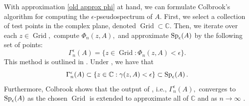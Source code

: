 



With approximation \eqref{old approx phi} at hand, we can formulate Colbrook's algorithm for computing the $\epsilon$-pseudospectrum of $A.$ First, we select a collection of test points in the complex plane, denoted $\operatorname{Grid} \subset \mathbb{C}.$ Then, we iterate over each $z \in \operatorname{Grid},$ compute
$\Phi_n(z, A),$ and approximate $\operatorname{Sp}_{\epsilon}\!\left(A\right)$ by the following set of points:
\begin{equation}
    \Gamma_n^{\epsilon}( A)  = \{ z \in \operatorname{Grid} : \Phi_n(z, A) < \epsilon\}.
\end{equation}
This method is outlined in . 
Under , we have that
\begin{equation}
    \Gamma_n^{\epsilon}(A) \subset \{z \in \mathbb{C} : \gamma(z, A) < \epsilon\} \subset \operatorname{Sp}_{\epsilon}\!\left(A\right).
\end{equation}
% 
Furthermore, Colbrook shows that the output of , i.e., $\Gamma_n^{\epsilon}(A),$ converges to $\operatorname{Sp}_{\epsilon}\!\left(A\right)$ as the chosen $\operatorname{Grid}$ is extended to approximate all of $\mathbb{C}$ and as  $n \rightarrow \infty$ \cite[Theorem~3.2.3]{Matt}. 



